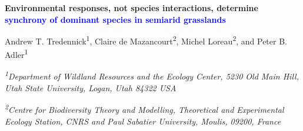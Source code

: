 \documentclass[11pt,]{article}
\title{}
\author{}
\date{}
\begin{document}
\maketitle

\thispagestyle{fancy}


\begin{singlespace}

\begin{center}
\large{\textbf{Environmental responses, not species interactions, determine \textcolor{blue}{synchrony of dominant species in semiarid grasslands}}}

\renewcommand*{\thefootnote}{\fnsymbol{footnote}}

\vspace{1em}

\normalsize{Andrew T. Tredennick\textsuperscript{1}, Claire de Mazancourt\textsuperscript{2}, Michel Loreau\textsuperscript{2}, and Peter B. Adler\textsuperscript{1}}

\vspace{1em}

\textit{\small{\textsuperscript{1}Department of Wildland Resources and the Ecology Center, 5230 Old Main Hill, Utah State University, Logan, Utah 84322 USA}}

\textit{\small{\textsuperscript{2}Centre for Biodiversity Theory and Modelling, Theoretical and Experimental Ecology Station, CNRS and Paul Sabatier University, Moulis, 09200, France}}

\end{center}

\end{singlespace}\renewcommand*{\thefootnote}{\arabic{footnote}}

\setcounter{footnote}{0}
\end{document}
